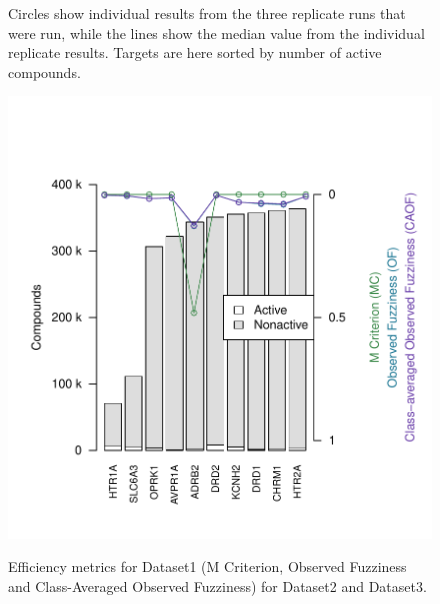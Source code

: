 \documentclass[utf8]{frontiersSCNS} %
\newcommand{\inlinetodo}[1]{{\color{magenta}\oldtodo[inline]{\color{white}\textsf{\small#1}}}}
\begin{document}
\begin{figure}[h!]
\begin{minipage}[t]{0.62\textwidth}
{            Circles show individual results from the three replicate runs that were
            run, while the lines show the median value from the individual replicate
            results. Targets are here sorted by number of active compounds.}
        \label{fig:21small_fill}
    \end{minipage}
    \begin{minipage}[t]{0.38\textwidth}
        \includegraphics[width=\textwidth]{figures/10large.pdf}
        \label{fig:10large}
    \end{minipage}
    \caption{Efficiency metrics for Dataset1 (M Criterion, Observed Fuzziness
    and Class-Averaged Observed Fuzziness) for Dataset2 and Dataset3.}
\end{figure}

%
%
\end{document}

